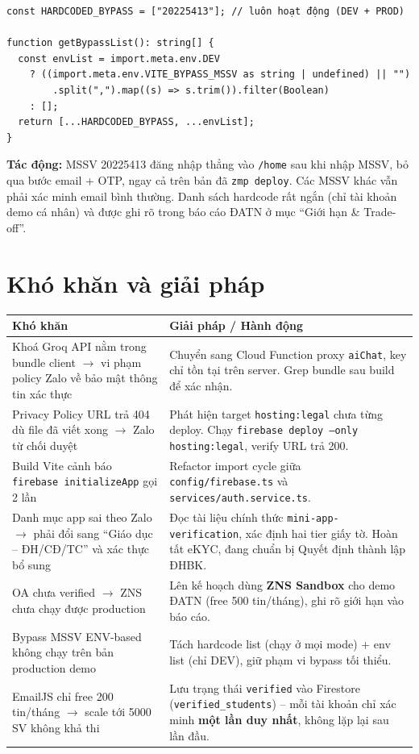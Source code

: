 \documentclass{article}
\begin{document}
\begin{verbatim}
const HARDCODED_BYPASS = ["20225413"]; // luôn hoạt động (DEV + PROD)

function getBypassList(): string[] {
  const envList = import.meta.env.DEV
    ? ((import.meta.env.VITE_BYPASS_MSSV as string | undefined) || "")
        .split(",").map((s) => s.trim()).filter(Boolean)
    : [];
  return [...HARDCODED_BYPASS, ...envList];
}
\end{verbatim}

\textbf{Tác động:} MSSV 20225413 đăng nhập thẳng vào \texttt{/home} sau khi nhập MSSV, bỏ qua bước email + OTP, ngay cả trên bản đã \texttt{zmp deploy}. Các MSSV khác vẫn phải xác minh email bình thường. Danh sách hardcode rất ngắn (chỉ tài khoản demo cá nhân) và được ghi rõ trong báo cáo ĐATN ở mục ``Giới hạn \& Trade-off''.

\section{Khó khăn và giải pháp}

\begin{tabularx}{\textwidth}{@{}X X@{}}
\toprule
\textbf{Khó khăn} & \textbf{Giải pháp / Hành động} \\
\midrule
Khoá Groq API nằm trong bundle client $\to$ vi phạm policy Zalo về bảo mật thông tin xác thực & Chuyển sang Cloud Function proxy \texttt{aiChat}, key chỉ tồn tại trên server. Grep bundle sau build để xác nhận. \\
\addlinespace
Privacy Policy URL trả 404 dù file đã viết xong $\to$ Zalo từ chối duyệt & Phát hiện target \texttt{hosting:legal} chưa từng deploy. Chạy \texttt{firebase deploy --only hosting:legal}, verify URL trả 200. \\
\addlinespace
Build Vite cảnh báo \texttt{firebase initializeApp} gọi 2 lần & Refactor import cycle giữa \texttt{config/firebase.ts} và \texttt{services/auth.service.ts}. \\
\addlinespace
Danh mục app sai theo Zalo $\to$ phải đổi sang ``Giáo dục -- ĐH/CĐ/TC'' và xác thực bổ sung & Đọc tài liệu chính thức \texttt{mini-app-verification}, xác định hai tier giấy tờ. Hoàn tất eKYC, đang chuẩn bị Quyết định thành lập ĐHBK. \\
\addlinespace
OA chưa verified $\to$ ZNS chưa chạy được production & Lên kế hoạch dùng \textbf{ZNS Sandbox} cho demo ĐATN (free 500 tin/tháng), ghi rõ giới hạn vào báo cáo. \\
\addlinespace
Bypass MSSV ENV-based không chạy trên bản production demo & Tách hardcode list (chạy ở mọi mode) + env list (chỉ DEV), giữ phạm vi bypass tối thiểu. \\
\addlinespace
EmailJS chỉ free 200 tin/tháng $\to$ scale tới 5000 SV không khả thi & Lưu trạng thái \texttt{verified} vào Firestore (\texttt{verified\_students}) -- mỗi tài khoản chỉ xác minh \textbf{một lần duy nhất}, không lặp lại sau lần đầu. \\
\bottomrule
\end{tabularx}
\end{document}
